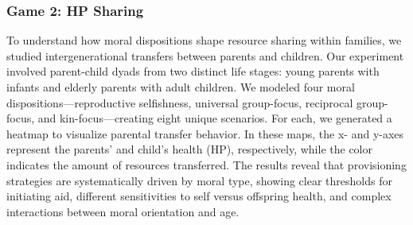 

\subsubsection{Game 2: HP Sharing}


To understand how moral dispositions shape resource sharing within families, we studied intergenerational transfers between parents and children. Our experiment involved parent-child dyads from two distinct life stages: young parents with infants and elderly parents with adult children. We modeled four moral dispositions—reproductive selfishness, universal group-focus, reciprocal group-focus, and kin-focus—creating eight unique scenarios. For each, we generated a heatmap to visualize parental transfer behavior. In these maps, the x- and y-axes represent the parents' and child's health (HP), respectively, while the color indicates the amount of resources transferred. The results reveal that provisioning strategies are systematically driven by moral type, showing clear thresholds for initiating aid, different sensitivities to self versus offspring health, and complex interactions between moral orientation and age.

